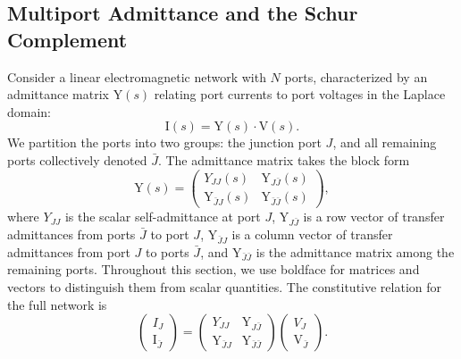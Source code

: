 \documentclass[reprint, floatfix, superscriptaddress, amsmath, amssymb, longbibliography]{revtex4-2}
\begin{document}
\subsection{Multiport Admittance and the Schur Complement}
\label{sec:multiport}
Consider a linear electromagnetic network with $N$ ports, characterized by an admittance matrix $\mathrm{Y}(s)$ relating port currents to port voltages in the Laplace domain:
\begin{equation}
\mathrm{I}(s) = \mathrm{Y}(s) \cdot \mathrm{V}(s).
\label{eq:admittance_relation}
\end{equation}
We partition the ports into two groups: the junction port $J$, and all remaining ports collectively denoted $\bar{J}$. The admittance matrix takes the block form
\begin{equation}
\mathrm{Y}(s) = \begin{pmatrix} Y_{JJ}(s) & \mathrm{Y}_{J\bar{J}}(s) \\[4pt] \mathrm{Y}_{\bar{J}J}(s) & \mathrm{Y}_{\bar{J}\bar{J}}(s) \end{pmatrix},
\label{eq:Y_partition}
\end{equation}
where $Y_{JJ}$ is the scalar self-admittance at port $J$, $\mathrm{Y}_{J\bar{J}}$ is a row vector of transfer admittances from ports $\bar{J}$ to port $J$, $\mathrm{Y}_{\bar{J}J}$ is a column vector of transfer admittances from port $J$ to ports $\bar{J}$, and $\mathrm{Y}_{\bar{J}\bar{J}}$ is the admittance matrix among the remaining ports. Throughout this section, we use boldface for matrices and vectors to distinguish them from scalar quantities.
The constitutive relation for the full network is
\begin{equation}
\begin{pmatrix} I_J \\ \mathrm{I}_{\bar{J}} \end{pmatrix} = \begin{pmatrix} Y_{JJ} & \mathrm{Y}_{J\bar{J}} \\[4pt] \mathrm{Y}_{\bar{J}J} & \mathrm{Y}_{\bar{J}\bar{J}} \end{pmatrix} \begin{pmatrix} V_J \\ \mathrm{V}_{\bar{J}} \end{pmatrix}.
\label{eq:constitutive_full}
\end{equation}
\end{document}
